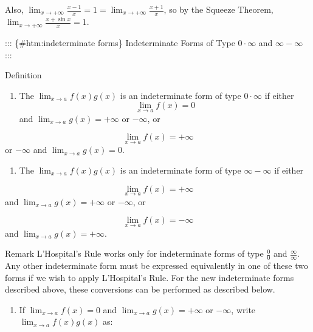 \documentclass[
  letterpaper,
  DIV=11,
  numbers=noendperiod]{scrartcl}
\providecommand{\tightlist}{%
  \setlength{\itemsep}{0pt}\setlength{\parskip}{0pt}}\usepackage{longtable,booktabs,array}
\begin{document}
Also,
\(\displaystyle\lim_{x\to+\infty}{\frac{x-1}{x}=1=\displaystyle\lim_{x\to+\infty}{\frac{x+1}{x}}}\),
so by the Squeeze Theorem,
\(\displaystyle\lim_{x\to+\infty}{\frac{x+\sin x}{x}=1}\).

::: \{\#htm:indeterminate forms\} Indeterminate Forms of Type
\(0\cdot \infty\) and \(\infty -\infty\) :::

\leavevmode{}%
Definition

\begin{enumerate}
\def\labelenumi{\arabic{enumi}.}
\tightlist
\item
  The \(\displaystyle\lim_{x\to a}{f(x)g(x)}\) is an indeterminate form
  of type \(0\cdot \infty\) if either \[
  \displaystyle\lim_{x\to a}{f(x)=0}\] and
  \(\displaystyle\lim_{x\to a}{g(x)=+\infty}\) or \(-\infty\), or
\end{enumerate}

\[
\displaystyle\lim_{x\to a}{f(x)=+\infty}
\] or \(-\infty\) and \(\displaystyle\lim_{x\to a}{g(x)=0}\).

\begin{enumerate}
\def\labelenumi{\arabic{enumi}.}
\setcounter{enumi}{1}
\tightlist
\item
  The \(\displaystyle\lim_{x\to a}{f(x)g(x)}\) is an indeterminate form
  of type \(\infty - \infty\) if either
\end{enumerate}

\[
\displaystyle\lim_{x\to a}{f(x)=+\infty}
\] and \(\displaystyle\lim_{x\to a}{g(x)=+\infty}\) or \(-\infty\), or

\[
\displaystyle\lim_{x\to a}{f(x)=-\infty}
\] and \(\displaystyle\lim_{x\to a}{g(x)=+\infty}\).

\leavevmode{}%
Remark L'Hospital's Rule works only for indeterminate forms of type
\(\frac{0}{0}\) and \(\frac{\infty}{\infty}\). Any other indeterminate
form must be expressed equivalently in one of these two forms if we wish
to apply L'Hospital's Rule. For the new indeterminate forms described
above, these conversions can be performed as described below.

\begin{enumerate}
\def\labelenumi{\arabic{enumi}.}
\tightlist
\item
  If \(\displaystyle\lim_{x\to a}{f(x)=0}\) and
  \(\displaystyle\lim_{x\to a}{g(x)=+\infty}\) or \(-\infty\), write
  \(\displaystyle\lim_{x\to a}{f(x)g(x)}\) as:
\end{enumerate}
\end{document}
